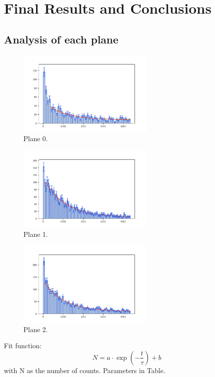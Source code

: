 \chapter{Final Results and Conclusions}
\label{sec:results}
\section{Analysis of each plane}
\begin{figure}
    \centering
    \includegraphics[width=0.6\textwidth]{plots/p0.pdf}
    \caption{Plane 0.}
    \label{fig:p0}
\end{figure}
\begin{figure}
    \centering
    \includegraphics[width=0.6\textwidth]{plots/p1.pdf}
    \caption{Plane 1.}
    \label{fig:p1}
\end{figure}
\begin{figure}
    \centering
    \includegraphics[width=0.6\textwidth]{plots/p2.pdf}
    \caption{Plane 2.}
    \label{fig:p2}
\end{figure}
Fit function:
\begin{equation*}
    N = a \cdot \exp(- \frac{t}{\tau}) + b
\end{equation*}
with N as the number of counts.
Parameters in Table.


